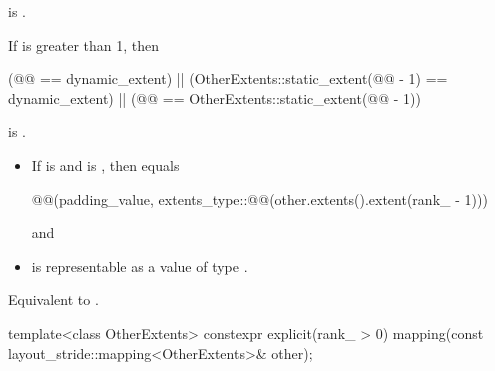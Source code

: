 \begin{itemdescr}
\pnum
\constraints
{} is .

\pnum
\mandates
If  is greater than 1, then
\begin{codeblock}
(@@ == dynamic_extent) ||
(OtherExtents::static_extent(@@ - 1) == dynamic_extent) ||
(@@ == OtherExtents::static_extent(@@ - 1))
\end{codeblock}
is .

\pnum
\expects
\begin{itemize}
\item
If  is  and
 is , then
 equals
\begin{codeblock}
@@(padding_value,
                        extents_type::@@(other.extents().extent(rank_ - 1)))
\end{codeblock}
and
\item
{} is representable as
a value of type .
\end{itemize}

\pnum
\effects
Equivalent to .
\end{itemdescr}

%
\begin{itemdecl}
template<class OtherExtents>
  constexpr explicit(rank_ > 0)
    mapping(const layout_stride::mapping<OtherExtents>& other);
\end{itemdecl}

